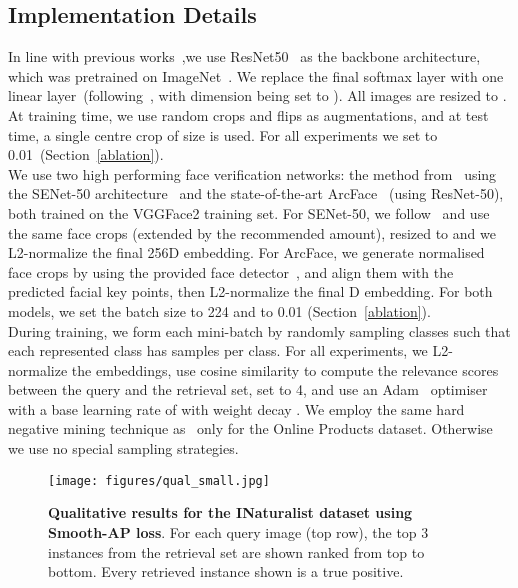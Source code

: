 \documentclass[runningheads]{llncs}
\begin{document}
\subsection{Implementation Details}
In line with previous works~\cite{Cakir19,Rolnek20optimizing,roth2019mic,sanakoyeu2019divide,wang2020cross,Wu17},we use ResNet50~\cite{He16} as the backbone architecture, 
which was pretrained on ImageNet~\cite{imagenet}.
We replace the final softmax layer with one linear layer~(following~\cite{Cakir19,Rolnek20optimizing}, 
with dimension being set to ).
All images are resized to . 
At training time, we use random crops and flips as augmentations, 
and at test time, a single centre crop of size  is used.
For all experiments we set  to 0.01~(Section~\ref{ablation}).\\

We use two high performing face verification networks: the method from~\cite{Cao18} using the SENet-50 architecture~\cite{Hu2018} and the state-of-the-art ArcFace~\cite{Deng19} (using ResNet-50), 
both trained on the VGGFace2 training set. 
For SENet-50, 
we follow~\cite{Cao18} and use the same face crops (extended by the recommended amount), 
resized to  and we L2-normalize the final 256D embedding.
For ArcFace, we generate normalised face crops  by using the provided face detector~\cite{Deng19}, 
and align them with the predicted  facial key points, 
then L2-normalize the final D embedding. 
For both models, we set the batch size to 224 and  to 0.01 (Section~\ref{ablation}). \\

During training, we form each mini-batch by randomly sampling classes such that each represented class has  samples per class. For all experiments, we L2-normalize the embeddings, use cosine similarity to compute the relevance scores between the query and the retrieval set, set  to 4, 
and use an Adam~\cite{KingmaB14} optimiser with a base learning rate of  with weight decay .
We employ the same hard negative mining technique as~\cite{Cakir19,Rolnek20optimizing} only for the Online Products dataset. 
Otherwise we use no special sampling strategies.

\begin{figure*}[t!]
\begin{center}
\texttt{[image: figures/qual\_small.jpg]}
\end{center}
\caption{\small{
\textbf{Qualitative results for the INaturalist dataset using Smooth-AP loss}. For each query image (top row), the top 3 instances from the retrieval set are shown ranked from top to bottom. Every retrieved instance shown is a true positive. }}
\label{fig:short}
\end{figure*}
\end{document}
